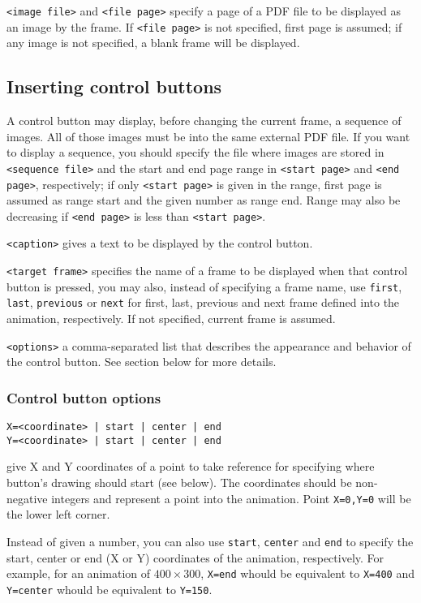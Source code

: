 \documentclass[a4paper,12pt]{article}
\begin{document}
\verb+<image file>+ and \verb+<file page>+ specify a page of a PDF file to be displayed as an image by the frame. If \verb+<file page>+ is not specified, first page is assumed; if any image is not specified, a blank frame  will be displayed.

\subsection{Inserting control buttons}
A control button may display, before changing the current frame, a sequence of images. All of those images must be into the same external PDF file. If you want to display a sequence, you should specify the file where images are stored in \verb+<sequence file>+ and the start and end page range in \verb+<start page>+ and \verb+<end page>+, respectively; if only \verb+<start page>+ is given in the range, first page is assumed as range start and the given number as range end. Range may also be decreasing if \verb+<end page>+ is less than \verb+<start page>+.

\verb+<caption>+ gives a text to be displayed by the control button.

\verb+<target frame>+ specifies the name of a frame to be displayed when that control button is pressed, you may also, instead of specifying a frame name, use \verb+first+, \verb+last+, \verb+previous+ or \verb+next+ for first, last, previous and next frame defined into the animation, respectively. If not specified, current frame is assumed. 

\verb+<options>+ a comma-separated list that describes the appearance and behavior of the control button. See section below for more details.

\subsubsection{Control button options}
\begin{verbatim}
X=<coordinate> | start | center | end
Y=<coordinate> | start | center | end
\end{verbatim}
give X and Y coordinates of a point to take reference for specifying where button's drawing should start (see below). The coordinates should be non-negative integers and represent a point into the animation. Point \verb+X=0,Y=0+ will be the lower left corner.

Instead of given a number, you can also use \verb+start+, \verb+center+ and \verb+end+ to specify the start, center or end (X or Y) coordinates of the animation, respectively. For example, for an animation of $400\times300$, \verb+X=end+ whould be equivalent to \verb+X=400+ and \verb+Y=center+ whould be equivalent to \verb+Y=150+.
\end{document}
